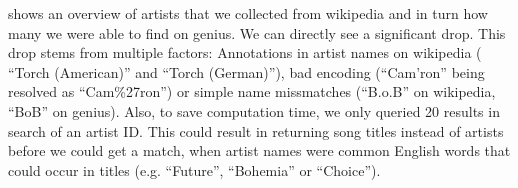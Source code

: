 \documentclass[11pt,a4paper]{article}
\begin{document}
 shows an overview of artists that we collected from wikipedia and in turn how many we were able to find on genius. We can directly see a significant drop. This drop stems from multiple factors: Annotations in artist names on wikipedia ( \enquote{Torch (American)} and \enquote{Torch (German)}), bad encoding (\enquote{Cam'ron} being resolved as \enquote{Cam\%27ron}) or simple name missmatches (\enquote{B.o.B} on wikipedia, \enquote{BoB} on genius). Also, to save computation time, we only queried 20 results in search of an artist ID. This could result in returning song titles instead of artists before we could get a match, when artist names were common English words that could occur in titles (e.g. \enquote{Future}, \enquote{Bohemia} or \enquote{Choice}).
\end{document}
